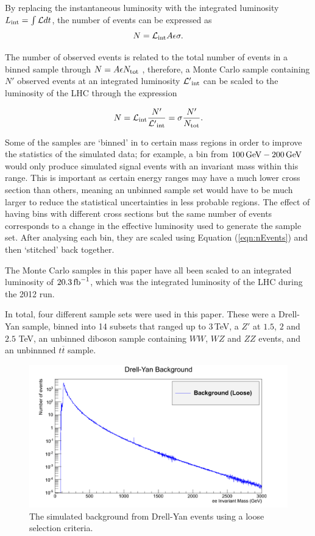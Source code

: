 \documentclass{article}
\begin{document}
By replacing the instantaneous luminosity with the integrated luminosity ${L}_{\rm{int}} = \int \mathcal{L}dt$, the number of events can be expressed as
\begin{equation}
N= \mathcal{L}_{\rm{int}}A\epsilon\sigma.
\end{equation}

The number of observed events is related to the total number of events in a binned sample through $N = A\epsilon N_{\rm{tot}}$ , therefore, a Monte Carlo sample containing $N'$ observed events at an integrated luminosity $\mathcal{L'}_{\rm{int}}$ can be scaled to the luminosity of the LHC through the expression

\begin{equation}
N = \mathcal{L}_{\rm{int}}\frac{N'}{\mathcal{L'}_{\rm{int}}} = \sigma\frac{N'}{N_{\rm{tot}}}.
\label{eqn:nEvents}
\end{equation}

Some of the samples are `binned' in to certain mass regions in order to improve the statistics of the simulated data; for example, a bin from $100\,\rm{GeV}-200\,\rm{GeV}$ would only produce simulated signal events with an invariant mass within this range. This is important as certain energy ranges may have a much lower cross section than others, meaning an unbinned sample set would have to be much larger to reduce the statistical uncertainties in less probable regions. The effect of having bins with different cross sections but the same number of events corresponds to a change in the effective luminosity used to generate the sample set. After analysing each bin, they are scaled using Equation (\ref{eqn:nEvents}) and then `stitched' back together.

The Monte Carlo samples in this paper have all been scaled to an integrated luminosity of $20.3\,\rm{fb}^{-1}$, which was the integrated luminosity of the LHC during the 2012 run.

In total, four different sample sets were used in this paper. These were a Drell-Yan sample, binned into 14 subsets that ranged up to $3\,$TeV, a $Z'$ at $1.5$, $2$ and $2.5$ TeV, an unbinned diboson sample containing $WW$, $WZ$ and $ZZ$ events, and an unbinnned $t\overline{t}$ sample.

\begin{figure}[h]
    \centering
    \includegraphics[scale=0.01]{images/DYBackground.png}
    \caption{The simulated background from Drell-Yan events using a loose selection criteria.}
\end{figure}
\end{document}
